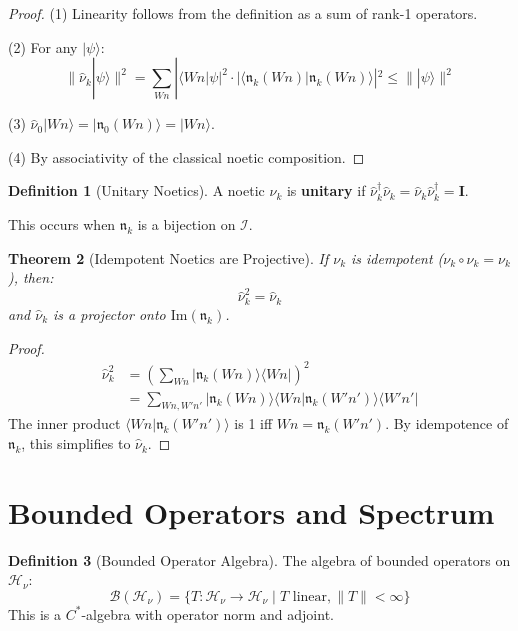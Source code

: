 \documentclass[11pt,twoside,openright]{book}
\theoremstyle{definition}
\newtheorem{definition}{Definition}[chapter]
\theoremstyle{plain}
\newtheorem{theorem}[definition]{Theorem}
\theoremstyle{remark}
\newcommand{\Ideas}{\mathcal{I}}
\newcommand{\noe}[1]{\nu_{#1}}
\newcommand{\Hspace}{\mathcal{H}}
\newcommand{\qket}[1]{|#1\rangle}
\newcommand{\qbra}[1]{\langle #1|}
\newcommand{\qbraket}[2]{\langle #1 | #2 \rangle}
\newcommand{\qop}[1]{\hat{#1}}
\newcommand{\BoundedOp}{\mathcal{B}}         %
\begin{document}
\begin{proof}
(1) Linearity follows from the definition as a sum of rank-1 operators.

(2) For any $\qket{\psi}$:
\[
\|\qop{\nu}_k\qket{\psi}\|^2 = \sum_{Wn} |\qbra{Wn}\psi|^2 \cdot |\qbraket{\mathfrak{n}_k(Wn)}{\mathfrak{n}_k(Wn)}|^2 \leq \|\qket{\psi}\|^2
\]

(3) $\qop{\nu}_0\qket{Wn} = \qket{\mathfrak{n}_0(Wn)} = \qket{Wn}$.

(4) By associativity of the classical noetic composition.
\end{proof}

\begin{definition}[Unitary Noetics]
\label{def:unitary-noetics}
A noetic $\noe{k}$ is \textbf{unitary} if $\qop{\nu}_k^\dagger \qop{\nu}_k = \qop{\nu}_k \qop{\nu}_k^\dagger = \mathbf{I}$.

This occurs when $\mathfrak{n}_k$ is a bijection on $\Ideas$.
\end{definition}

\begin{theorem}[Idempotent Noetics are Projective]
\label{thm:idem-projective}
If $\noe{k}$ is idempotent ($\noe{k} \circ \noe{k} = \noe{k}$), then:
\[
\qop{\nu}_k^2 = \qop{\nu}_k
\]
and $\qop{\nu}_k$ is a projector onto $\mathrm{Im}(\mathfrak{n}_k)$.
\end{theorem}

\begin{proof}
\begin{align}
\qop{\nu}_k^2 &= \left(\sum_{Wn} \qket{\mathfrak{n}_k(Wn)}\qbra{Wn}\right)^2 \\
&= \sum_{Wn, W'n'} \qket{\mathfrak{n}_k(Wn)}\qbraket{Wn}{\mathfrak{n}_k(W'n')}\qbra{W'n'}
\end{align}
The inner product $\qbraket{Wn}{\mathfrak{n}_k(W'n')}$ is 1 iff $Wn = \mathfrak{n}_k(W'n')$. By idempotence of $\mathfrak{n}_k$, this simplifies to $\qop{\nu}_k$.
\end{proof}

\section{Bounded Operators and Spectrum}

\begin{definition}[Bounded Operator Algebra]
\label{def:bounded-ops}
The algebra of bounded operators on $\Hspace_\nu$:
\[
\BoundedOp(\Hspace_\nu) = \{T : \Hspace_\nu \to \Hspace_\nu \mid T \text{ linear}, \|T\| < \infty\}
\]
This is a $C^*$-algebra with operator norm and adjoint.
\end{definition}
\end{document}
